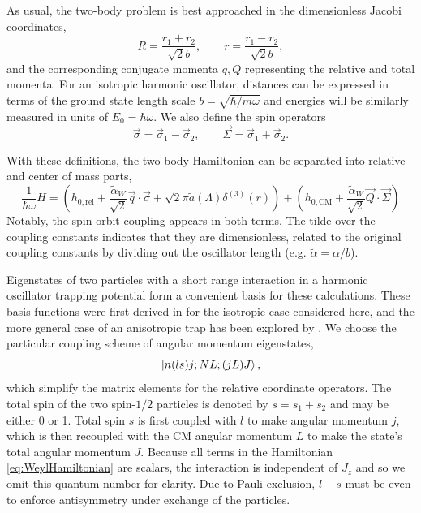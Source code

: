 \documentclass[%
 preprint,
 amsmath,amssymb,
 aps,
]{revtex4-1}
\begin{document}
As usual, the two-body problem is best approached in the dimensionless Jacobi coordinates,
\begin{equation}
R=\frac{r_1+r_2}{\sqrt{2}b}, \qquad r=\frac{r_1-r_2}{\sqrt{2}b},
\end{equation}
and the corresponding conjugate momenta $q,Q$ representing the relative and total momenta. For an isotropic harmonic oscillator, distances can be expressed in terms of the ground state length scale $b=\sqrt{\hbar/m\omega}$ and energies will be similarly measured in units of $E_0=\hbar\omega$. We also define the spin operators
\begin{equation}
\vec{\sigma}=\vec{\sigma}_1-\vec{\sigma}_2, \qquad \vec{\Sigma}=\vec{\sigma}_1+\vec{\sigma}_2.
\end{equation}

With these definitions, the two-body Hamiltonian can be separated into relative and center of mass parts,
\begin{equation}\label{eq:WeylHamiltonian}
\frac{1}{\hbar\omega}H=\left(h_{0,\text{rel}}+\frac{\tilde{\alpha}_W}{\sqrt{2}} \vec{q}\cdot\vec{\sigma} + \sqrt{2}\pi \tilde{a}(\Lambda) \delta^{(3)}(r)\right)+\left(h_{0,\text{CM}}+\frac{\tilde{\alpha}_W}{\sqrt{2}} \vec{Q}\cdot\vec{\Sigma} \right)
\end{equation}
Notably, the spin-orbit coupling appears in both terms. The tilde over the coupling constants indicates that they are dimensionless, related to the original coupling constants by dividing out the oscillator length (e.g. $\tilde{\alpha}=\alpha/b$).

Eigenstates of two particles with a short range interaction in a harmonic oscillator trapping potential form a convenient basis for these calculations. These basis functions were first derived in \cite{Busch} for the isotropic case considered here, and the more general case of an anisotropic trap has been explored by \cite{PhysRevA.74.022712}. We choose the particular coupling scheme of angular momentum eigenstates,
\begin{equation}\label{eq:basisStates}
\ket{n(ls)j;NL;(jL)J},
\end{equation}
which simplify the matrix elements for the relative coordinate operators. The total spin of the two spin-$1/2$ particles is denoted by $s = s_1 + s_2$ and may be either 0 or 1. Total spin $s$ is first coupled with $l$ to make angular momentum $j$, which is then recoupled with the CM angular momentum $L$ to make the state's total angular momentum $J$. Because all terms in the Hamiltonian \eqref{eq:WeylHamiltonian} are scalars, the interaction is independent of $J_z$ and so we omit this quantum number for clarity. Due to Pauli exclusion, $l + s$ must be even to enforce antisymmetry under exchange of the particles.
\end{document}
